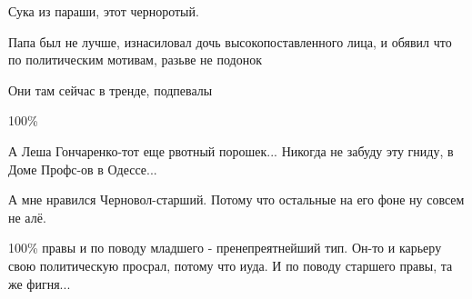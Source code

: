 \begin{itemize}
Сука из параши, этот черноротый.

Папа был не лучше, изнасиловал дочь высокопоставленного лица, и обявил что по политическим мотивам, разьве не подонок

Они там сейчас в тренде, подпевалы

100\%

А Леша Гончаренко-тот еще рвотный порошек... Никогда не забуду эту гниду, в Доме Профс-ов в Одессе...

А мне нравился Черновол-старший. Потому что остальные на его фоне ну совсем не алё.


100\% правы и по поводу младшего - пренепреятнейший тип. Он-то и карьеру свою
политическую просрал, потому что иуда. И по поводу старшего правы, та же
фигня...


\end{itemize} %
